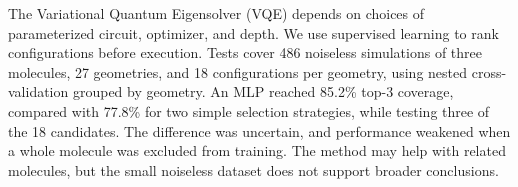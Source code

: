 The Variational Quantum Eigensolver (VQE) depends on choices of parameterized
circuit, optimizer, and depth. We use supervised learning to rank configurations
before execution. Tests cover 486 noiseless simulations of three molecules, 27
geometries, and 18 configurations per geometry, using nested cross-validation
grouped by geometry. An MLP reached 85.2\% top-3 coverage, compared with 77.8\%
for two simple selection strategies, while testing three of the 18 candidates.
The difference was uncertain, and performance weakened when a whole molecule
was excluded from training. The method may help with related molecules, but the
small noiseless dataset does not support broader conclusions.
